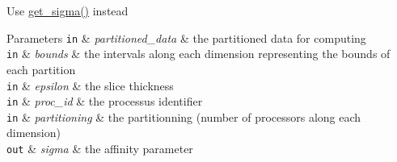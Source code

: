 
\begin{DoxyRefList}
\item[\label{deprecated__deprecated000001}%
\hypertarget{deprecated__deprecated000001}{}%
Subprogram \hyperlink{namespacemodule__calcul_a118fd6a58b1064989fa68460457bea60}{module\+\_\+calcul\+:\+:get\+\_\+sigma\+\_\+interface} (proc\+\_\+id, partitioned\+\_\+data, sigma, bounds, partitioning, epsilon)]Use \hyperlink{namespacemodule__calcul_abd05b2b3ee81b4f779744a951d8a4c05}{get\+\_\+sigma()} instead 
\begin{DoxyParams}[1]{Parameters}
\mbox{\tt in}  & {\em partitioned\+\_\+data} & the partitioned data for computing \\
\hline
\mbox{\tt in}  & {\em bounds} & the intervals along each dimension representing the bounds of each partition \\
\hline
\mbox{\tt in}  & {\em epsilon} & the slice thickness \\
\hline
\mbox{\tt in}  & {\em proc\+\_\+id} & the processus identifier \\
\hline
\mbox{\tt in}  & {\em partitioning} & the partitionning (number of processors along each dimension) \\
\hline
\mbox{\tt out}  & {\em sigma} & the affinity parameter \\
\hline
\end{DoxyParams}

\end{DoxyRefList}
